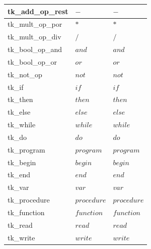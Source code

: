 \begin{table}[H]
\begin{tabular}{|l|l|l|}
tk\_add\_op\_rest   & $-$                                             & $-$                  \\ \hline
tk\_mult\_op\_por  & $*$                                              & $*$                  \\ \hline
tk\_mult\_op\_div  & $/$                                              & $/$                  \\ \hline
tk\_bool\_op\_and  & $and$                                           & $and$                \\ \hline
tk\_bool\_op\_or  & $or$                                           & $or$                \\ \hline
tk\_not\_op   & $not$                                                & $not$                \\ \hline
tk\_if        & $if$                                                 & $if$                 \\ \hline
tk\_then      & $then$                                               & $then$               \\ \hline
tk\_else      & $else$                                               & $else$               \\ \hline
tk\_while     & $while$                                              & $while$              \\ \hline
tk\_do        & $do$                                                 & $do$                 \\ \hline
tk\_program   & $program$                                            & $program$            \\ \hline
tk\_begin     & $begin$                                              & $begin$              \\ \hline
tk\_end       & $end$                                                & $end$                \\ \hline
tk\_var       & $var$                                                & $var$                \\ \hline
tk\_procedure & $procedure$                                          & $procedure$          \\ \hline
tk\_function  & $function$                                           & $function$           \\ \hline
tk\_read  & $read$                                           & $read$           \\ \hline
tk\_write  & $write$                                           & $write$           \\ \hline

\end{tabular}
\end{table}
